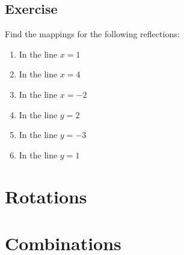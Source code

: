 \subsection{Exercise}
Find the mappings for the following reflections:
\begin{enumerate}
	\item In the line $x=1$
	\item In the line $x=4$
	\item In the line $x=-2$
	\item In the line $y=2$
	\item In the line $y=-3$
	\item In the line $y=1$
\end{enumerate}


\section{Rotations}
\section{Combinations}
